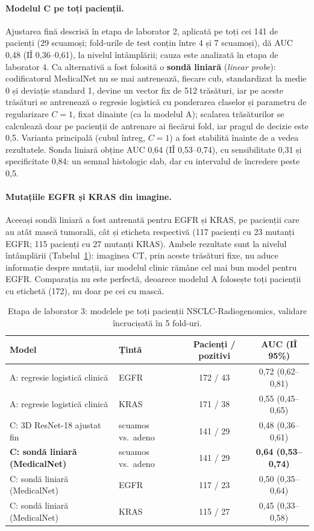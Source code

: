 \documentclass[11pt, a4paper]{article}
\begin{document}
\paragraph{Modelul C pe toți pacienții.} Ajustarea fină descrisă în etapa de laborator 2, aplicată pe toți cei 141 de pacienți (29 scuamoși; fold-urile de test conțin între 4 și 7 scuamoși), dă AUC 0,48 (IÎ 0,36--0,61), la nivelul întâmplării; cauza este analizată în etapa de laborator 4. Ca alternativă a fost folosită o \textbf{sondă liniară} (\textit{linear probe}): codificatorul MedicalNet nu se mai antrenează, fiecare cub, standardizat la medie 0 și deviație standard 1, devine un vector fix de 512 trăsături, iar pe aceste trăsături se antrenează o regresie logistică cu ponderarea claselor și parametru de regularizare $C = 1$, fixat dinainte (ca la modelul A); scalarea trăsăturilor se calculează doar pe pacienții de antrenare ai fiecărui fold, iar pragul de decizie este 0,5. Varianta principală (cubul întreg, $C = 1$) a fost stabilită înainte de a vedea rezultatele. Sonda liniară obține AUC 0,64 (IÎ 0,53--0,74), cu sensibilitate 0,31 și specificitate 0,84: un semnal histologic slab, dar cu intervalul de încredere peste 0,5.

\paragraph{Mutațiile EGFR și KRAS din imagine.} Aceeași sondă liniară a fost antrenată pentru EGFR și KRAS, pe pacienții care au atât mască tumorală, cât și eticheta respectivă (117 pacienți cu 23 mutanți EGFR; 115 pacienți cu 27 mutanți KRAS). Ambele rezultate sunt la nivelul întâmplării (Tabelul~\ref{tab:etapa3}): imaginea CT, prin aceste trăsături fixe, nu aduce informație despre mutații, iar modelul clinic rămâne cel mai bun model pentru EGFR. Comparația nu este perfectă, deoarece modelul A folosește toți pacienții cu etichetă (172), nu doar pe cei cu mască.

\begin{table}[h]
\centering
\small
\begin{tabular}{@{}llcc@{}}
\toprule
\textbf{Model} & \textbf{Țintă} & \textbf{Pacienți / pozitivi} & \textbf{AUC (IÎ 95\%)} \\ \midrule
A: regresie logistică clinică & EGFR & 172 / 43 & 0,72 (0,62--0,81) \\
A: regresie logistică clinică & KRAS & 171 / 38 & 0,55 (0,45--0,65) \\
C: 3D ResNet-18 ajustat fin & scuamos vs.\ adeno & 141 / 29 & 0,48 (0,36--0,61) \\
\textbf{C: sondă liniară (MedicalNet)} & scuamos vs.\ adeno & 141 / 29 & \textbf{0,64 (0,53--0,74)} \\
C: sondă liniară (MedicalNet) & EGFR & 117 / 23 & 0,50 (0,35--0,64) \\
C: sondă liniară (MedicalNet) & KRAS & 115 / 27 & 0,45 (0,33--0,58) \\ \bottomrule
\end{tabular}
\caption{Etapa de laborator 3: modelele pe toți pacienții NSCLC-Radiogenomics, validare încrucișată în 5 fold-uri.}
\label{tab:etapa3}
\end{table}
\end{document}
